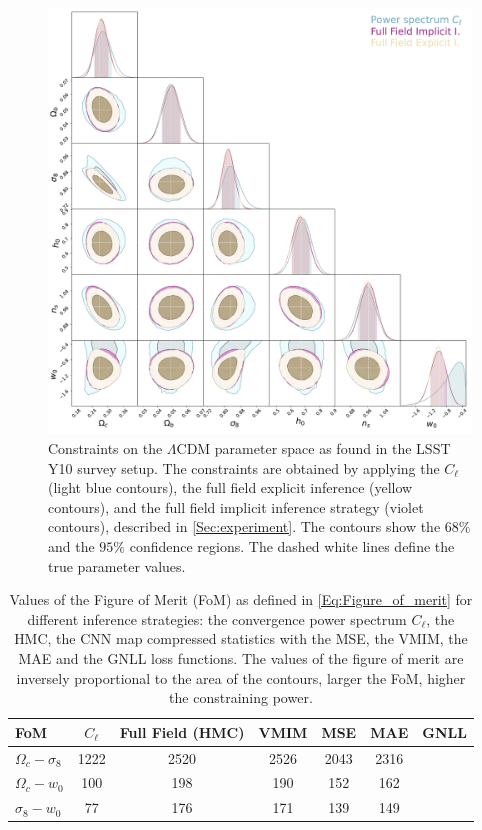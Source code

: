 \documentclass{aa}
\begin{document}
\begin{figure}
    \centering
\includegraphics[width=\textwidth]{figures/contours_posterior_imp_ex_ps.pdf}
    \caption{
Constraints on the $\Lambda$CDM parameter space as found in the LSST Y10 survey setup. The constraints are obtained by applying the $C_{\ell}$ (light blue contours), the full field explicit inference (yellow contours), and the full field implicit inference strategy (violet contours), described in \autoref{Sec:experiment}.
The contours show the $68\%$ and the $95\%$  confidence regions. The dashed white lines define the true parameter values.}
\label{fig:contours_posterior_imp_ex_ps}
\end{figure}
\begin{center}
\begin{table}
\caption{ Values of the Figure of Merit (FoM) as defined in \autoref{Eq:Figure_of_merit} for different inference strategies: the convergence power spectrum $C_{\ell}$, the HMC, the CNN map compressed statistics with the MSE, the VMIM, the MAE and the GNLL loss functions. The values of the figure of merit are inversely proportional to the area of the contours, larger the FoM, higher the constraining power.}
\begin{tabular}{lcccccc} 
 \hline
    FoM & $C_{\ell}$ & Full Field (HMC)&  VMIM & MSE & MAE & GNLL   \\
  \hline\hline
 $\Omega_c-  \sigma_8$ & 1222 & 2520 & 2526 & 2043 & 2316\\
 $\Omega_c-  w_0$      & 100  & 198  & 190  & 152  & 162\\
 $\sigma_8-  w_0$      & 77   & 176  & 171  & 139  & 149\\

     \hline
\end{tabular}
\label{tab:f_o_m}
\end{table}
\end{center}
\end{document}
